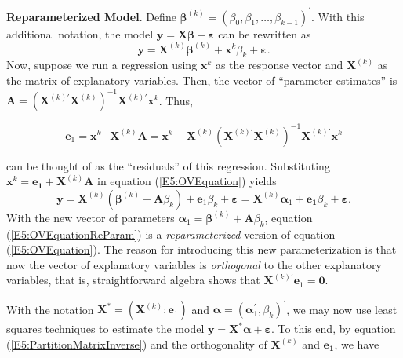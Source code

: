 \textbf{Reparameterized Model}. Define $\boldsymbol
\beta^{(k)}=(\beta _{0},\beta _{1},\ldots,\beta _{k-1})^{\prime }$.
With this additional notation, the model
$\mathbf{y}=\mathbf{X\boldsymbol \beta + \boldsymbol \varepsilon}$
can be rewritten as
\begin{equation}\label{E5:OVEquation}
\mathbf{y}=\mathbf{X}^{(k)}{\boldsymbol \beta
}^{(k)}+\mathbf{x}^{k}\beta _{k}+ \boldsymbol \varepsilon.
\end{equation}
Now, suppose we run a regression using $\mathbf{x}^{k}$ as the
response vector and $\mathbf{X}^{(k)}$ as the matrix of explanatory
variables. Then,
the vector of ``parameter estimates'' is $\mathbf{A}=\left( \mathbf{X}%
^{(k)\prime }\mathbf{X}^{(k)}\right) ^{-1}\mathbf{X}^{(k)\prime }\mathbf{x}%
^{k}$. Thus,
\begin{center}
\[
\mathbf{e}_{1}=\mathbf{x}^{k}\mathbf{-X}^{(k)}\mathbf{A}=\mathbf{x}%
^{k}-\mathbf{X}^{(k)}\left( \mathbf{X}^{(k)\prime }\mathbf{X}^{(k)}\right)
^{-1}\mathbf{X}^{(k)\prime }\mathbf{x}^{k}
\]
\end{center}
can be thought of as the ``residuals'' of this regression. Substituting $%
\mathbf{x}^{k}=\mathbf{e_{1}}+\mathbf{X}^{(k)}\mathbf{A}$ in
equation (\ref{E5:OVEquation}) yields
\begin{equation}\label{E5:OVEquationReParam}
\mathbf{y}=\mathbf{X}^{(k)}(\mathbf{\beta }^{(k)}+\mathbf{A}\beta _{k})+%
\mathbf{e}_{1} \beta_{k} + \boldsymbol \varepsilon =
\mathbf{X}^{(k)} \boldsymbol \alpha_{1} + \mathbf{e_{1}} \beta_{k} +
\boldsymbol \varepsilon.
\end{equation}
With the new vector of parameters $\boldsymbol
\alpha_{1}=\boldsymbol \beta ^{(k)}+\mathbf{A}\beta _{k}$, equation
(\ref{E5:OVEquationReParam}) is a \textit{reparameterized} version
of equation (\ref{E5:OVEquation}). The reason for introducing this
new parameterization is that now the vector of explanatory variables
is \textit{orthogonal} to the other explanatory variables, that is,
straightforward algebra shows that $\mathbf{X}^{(k)\prime
}\mathbf{e}_{1}=\mathbf{0}$.

With the notation $\mathbf{X}^{\ast} = (\mathbf{X}^{(k)}:
\mathbf{e}_{1})$ and $\boldsymbol \alpha = (\boldsymbol
\alpha_{1}^{\prime }, \beta_{k})^{\prime }$, we may now use least
squares techniques to estimate the model
$\mathbf{y}=\mathbf{X}^{\ast }\boldsymbol \alpha + \boldsymbol
\varepsilon$. To this
end, by equation (\ref{E5:PartitionMatrixInverse}) and the orthogonality of $\mathbf{X}^{(k)}$ and $%
\mathbf{e_{1}}$, we have


